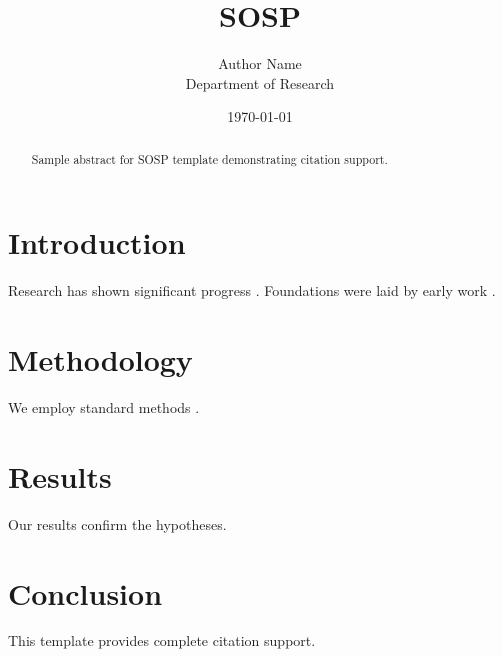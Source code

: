 \documentclass{article}
\title{SOSP}
\author{Author Name \\ \small Department of Research}
\date{\today}
\begin{document}
\maketitle

\begin{abstract}
Sample abstract for SOSP template demonstrating citation support.
\end{abstract}

\section{Introduction}
Research has shown significant progress \citep{einstein1905}. Foundations were laid by early work \citep{turing1950}.

\section{Methodology}
We employ standard methods \citep{knuth1984}.

\section{Results}
Our results confirm the hypotheses.

\section{Conclusion}
This template provides complete citation support.



\end{document}
